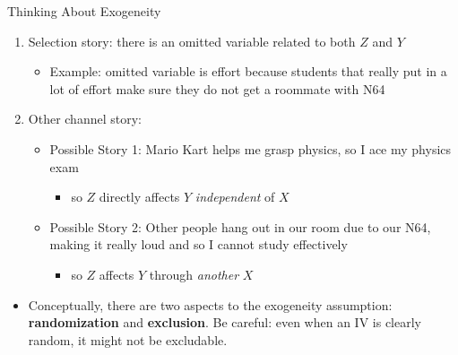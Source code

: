 \documentclass[aspectratio=169,11pt]{beamer}
\begin{document}
\begin{frame}{Thinking About Exogeneity}
\begin{enumerate}
\item Selection story: there is an omitted variable related to both $Z$ and $Y$
\begin{itemize}
\item Example: omitted variable is effort because students that really put in a lot of effort make sure they do not get a roommate with N64
\end{itemize}
\medskip
\item Other channel story:
\begin{itemize}
\item Possible Story 1: Mario Kart helps me grasp physics, so I ace my physics exam
\begin{itemize}
\item so $Z$ directly affects $Y$ \emph{independent} of $X$
\end{itemize}
\item Possible Story 2: Other people hang out in our room due to our N64, making it really loud and so I cannot study effectively
\begin{itemize}
\item so $Z$ affects $Y$ through \emph{another} $X$
\end{itemize}
\end{itemize}
\end{enumerate}
\begin{itemize}
\item Conceptually, there are two aspects to the exogeneity assumption: {\bf randomization} and {\bf exclusion}.
Be careful: even when an IV is clearly random, it might not be excludable. 
\end{itemize}
\end{frame}
\end{document}
